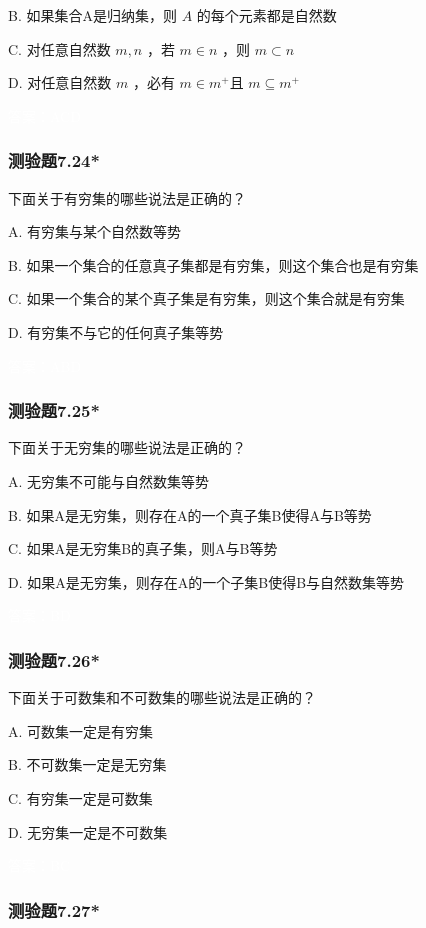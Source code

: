 \documentclass[UTF8, heading=true]{ctexart}
\begin{document}
B. 
如果集合A是归纳集，则 $A$ 的每个元素都是自然数

C. 
对任意自然数 $m, n$ ，若 $m \in n$ ，则 $m \subset n$

D.  
对任意自然数 $m$ ，必有 $m \in m^{+}$且 $m \subseteq m^{+}$

\textcolor{white}{答案：ACD}

\subsubsection{测验题7.24*}

下面关于有穷集的哪些说法是正确的？

A. 有穷集与某个自然数等势

B. 如果一个集合的任意真子集都是有穷集，则这个集合也是有穷集

C. 如果一个集合的某个真子集是有穷集，则这个集合就是有穷集

D. 有穷集不与它的任何真子集等势

\textcolor{white}{答案：ABD}

\subsubsection{测验题7.25*}

下面关于无穷集的哪些说法是正确的？

A. 无穷集不可能与自然数集等势

B. 如果A是无穷集，则存在A的一个真子集B使得A与B等势

C. 如果A是无穷集B的真子集，则A与B等势

D. 如果A是无穷集，则存在A的一个子集B使得B与自然数集等势

\textcolor{white}{答案：BD}


\subsubsection{测验题7.26*}

下面关于可数集和不可数集的哪些说法是正确的？

A. 可数集一定是有穷集

B. 不可数集一定是无穷集

C. 有穷集一定是可数集

D. 无穷集一定是不可数集

\textcolor{white}{答案：BC}

\subsubsection{测验题7.27*}
\end{document}
